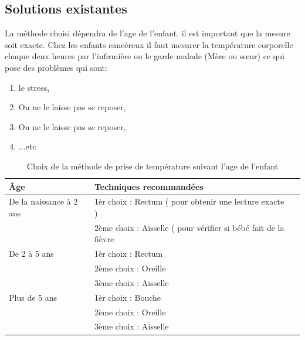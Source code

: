 \documentclass[12pt]{article}
\begin{document}
\subsection{Solutions existantes}
La méthode choisi dépendra de l’age de l’enfant, il est important que la mesure soit exacte. Chez les enfants cancéreux il faut mesurer la température corporelle chaque deux heures par l’infirmière ou le garde malade (Mère ou sœur) ce qui pose des problèmes qui sont:
\begin{enumerate}
	\item le stress,
	\item On ne le laisse pas se reposer,
	\item On ne le laisse pas se reposer,
	\item ...etc
\end{enumerate}
\newpage
\begin{table}[h]
	\centering
	\caption{Choix de la méthode de prise de température suivant l’age de l’enfant}
	\begin{tabular}{ | l | l | c }
		\hline
		\bfseries{Âge} & \bfseries{Techniques recommandées}\\ \hline
		De la naissance à 2 ans & 1èr choix : Rectum ( pour obtenir une lecture exacte )\\
		                                      &  2ème choix : Aisselle ( pour vérifier si bébé fait de la fièvre\\
\hline
		De 2 à 5 ans & 1èr choix : Rectum\\
							& 2ème choix : Oreille\\
							& 3ème choix : Aisselle\\ 
\hline
		Plus de 5 ans & 1èr choix : Bouche\\
							  & 2ème choix : Oreille\\
							  & 3ème choix : Aisselle\\ 
\hline 
	\end{tabular}
\end{table}
\end{document}
